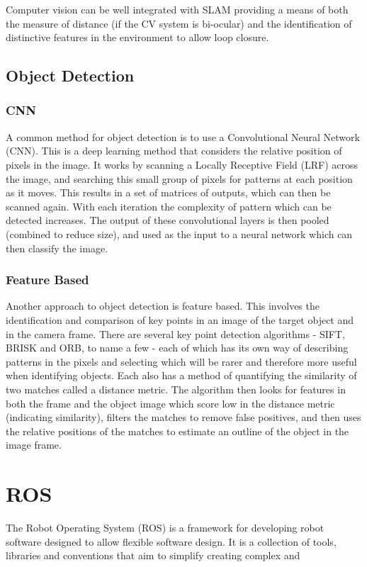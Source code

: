 Computer vision can be well integrated with SLAM providing a means of both the measure
of distance (if the CV system is bi-ocular) and the identification of distinctive
features in the environment to allow loop closure\cite{CVho2006loop}.
\subsection{Object Detection}\label{litreview/cv/objDet}
\subsubsection{CNN}\label{litreview/cv/objDet/CNN}
A common method for object detection is to use a Convolutional 
Neural Network (CNN). This is a deep learning method that 
considers the relative position of pixels in the image. It 
works by scanning a Locally Receptive Field (LRF) across the 
image, and searching this small group of pixels for patterns 
at each position as it moves. This results in a set of 
matrices of outputs, which can then be scanned again. With 
each iteration the complexity of pattern which can be detected 
increases. The output of these convolutional layers is then 
pooled (combined to reduce size), and used as the input to a 
neural network which can then classify the image.


\subsubsection{Feature Based}\label{litreview/cv/objDet/fb}
Another approach to object detection is feature based. This 
involves the identification and comparison of key points in an 
image of the target object and in the camera frame. There are 
several key point detection algorithms - SIFT, BRISK and ORB, 
to name a few - each of which has its own way of describing 
patterns in the pixels and selecting which will be rarer and 
therefore more useful when identifying objects. Each also has 
a method of quantifying the similarity of two matches called a 
distance metric. The algorithm then looks for features in both 
the frame and the object image which score low in the distance 
metric (indicating similarity), filters the matches to remove 
false positives, and then uses the relative positions of the 
matches to estimate an outline of the object in the image 
frame. 

\section{ROS}\label{litreview/ROS}
The Robot Operating System (ROS) is a framework for developing robot
software designed to allow flexible software design. It is a collection of tools, 
libraries and conventions that aim to simplify creating complex and 

